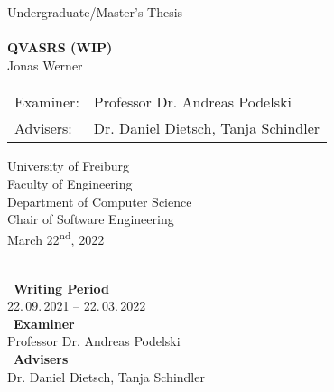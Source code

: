 
\begin{titlepage}
\begin{center}


{\Large Undergraduate/Master's Thesis}\\[1.3cm]


\HorizontalLine \\[0.4cm]
{ \huge \bfseries QVASRS (WIP) }
\HorizontalLine \\[1.5cm]


{\Huge Jonas Werner } \\[2cm]


\begin{tabular}[hc]{>{\huge}l >{\huge}l}
  Examiner: & Professor Dr. Andreas Podelski \\[0.3cm]
  Advisers: & Dr. Daniel Dietsch, Tanja Schindler \\[1.2cm]
\end{tabular}
\vfill  %

\Large {
    University of Freiburg\\
    Faculty of Engineering\\
    Department of Computer Science\\
    Chair of Software Engineering\\[1cm]

    March 22\textsuperscript{nd}, 2022\\
}
\end{center}
\end{titlepage}

\thispagestyle{empty}
\ \vfill \ \\  %
\
\textbf{Writing Period}            \smallskip{} \\
22.\,09.\,2021 -- 22.\,03.\,2022   \bigskip{} \\
\
\textbf{Examiner}                  \smallskip{} \\
Professor Dr. Andreas Podelski                     \bigskip{} \\
\
\textbf{Advisers}                  \smallskip{} \\
Dr. Daniel Dietsch, Tanja Schindler
\pagebreak